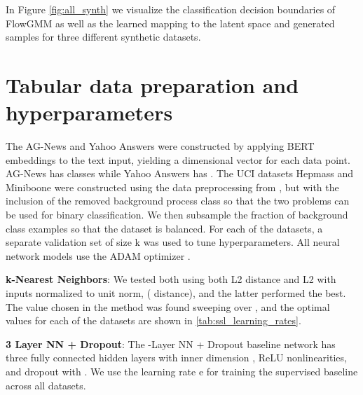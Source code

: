 \documentclass{article}
\newcommand{\method}{FlowGMM\xspace}
\begin{document}
\begin{figure*}
{\begin{tikzpicture}
\end{tikzpicture}
}
\caption{
        Illustration of \method on synthetic datasets: 
        two circles (top row), eight Gaussians (middle row) and pinwheel (bottom row).
        \textbf{(a):} Data distribution and classification decision boundaries. Unlabeled data are shown with blue circles and labeled data are shown with colored triangles, where color represents the class. Background color visualizes the classification decision boundaries of \method.
        \textbf{(b):} Mapping of the data to the latent space.
        \textbf{(c):} Gaussian mixture in the latent space.
        \textbf{(d):} Samples from the learned generative model corresponding to different classes, as shown by their color.
    }
	\label{fig:all_synth}
    \vspace{-.5cm}
\end{figure*}

In Figure \ref{fig:all_synth} we visualize the classification decision boundaries of \method as well as the learned mapping to the latent space and generated samples for three different synthetic datasets. 

\section{Tabular data preparation and hyperparameters}\label{sec:tabulardetails}
The AG-News and Yahoo Answers were constructed by applying BERT embeddings to the text input, yielding a  dimensional vector for each data point. AG-News has  classes while Yahoo Answers has . The UCI datasets Hepmass and Miniboone were constructed using the data preprocessing from \citet{papamakarios2017masked}, but with the inclusion of the removed background process class so that the two problems can be used for binary classification. We then subsample the fraction of background class examples so that the dataset is balanced. For each of the datasets, a separate validation set of size k was used to tune hyperparameters. All neural network models use the ADAM optimizer \citep{kingma2014adam}. 

\textbf{k-Nearest Neighbors}: We tested both using both L2 distance and L2 with inputs normalized to unit norm, ( distance), and the latter performed the best. The value  chosen in the method was found sweeping over , and the optimal values for each of the datasets are shown in \ref{tab:ssl_learning_rates}.

\textbf{3 Layer NN + Dropout}: The -Layer NN + Dropout baseline network has three fully connected hidden layers with inner dimension , \textrm{ReLU} nonlinearities, and dropout with . We use the learning rate e for training the supervised baseline across all datasets.
\end{document}
